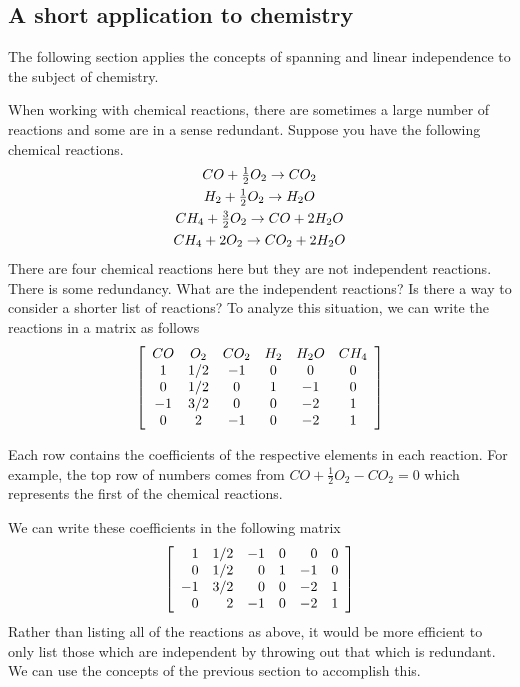\subsection{A short application to chemistry}

The following section applies the concepts of spanning and linear independence to the subject of chemistry. 

When working with chemical reactions, there are sometimes a large number of reactions and some are in a sense redundant. Suppose you have the following chemical
reactions.
\begin{equation*}
\begin{array}{c}
CO+\vspace{0.05in}\frac{1}{2}O_{2}\rightarrow CO_{2} \\
H_{2}+\vspace{0.05in}\frac{1}{2}O_{2}\rightarrow H_{2}O \\
CH_{4}+\vspace{0.05in}\frac{3}{2}O_{2}\rightarrow CO+2H_{2}O \\
CH_{4}+2O_{2}\rightarrow CO_{2}+2H_{2}O
\end{array}
\end{equation*}
There are four chemical reactions here but they are not independent
reactions. There is some redundancy. What are the independent reactions? Is
there a way to consider a shorter list of reactions? To analyze this
situation, we can write the reactions in a matrix as follows
\begin{equation*}
\left[
\begin{array}{cccccc}
CO & O_{2} & CO_{2} & H_{2} & H_{2}O & CH_{4} \\
1 & 1/2 & -1 & 0 & 0 & 0 \\
0 & 1/2 & 0 & 1 & -1 & 0 \\
-1 & 3/2 & 0 & 0 & -2 & 1 \\
0 & 2 & -1 & 0 & -2 & 1
\end{array}
\right]
\end{equation*}

Each row contains the coefficients of the respective elements in each reaction. For example, the top row of numbers comes from $CO+\frac{1}{2}O_{2}-CO_{2}=0$ which
represents the first of the chemical reactions. 

We can write these coefficients in the following matrix
\begin{equation*}
\left[
\begin{array}{rrrrrr}
1 & 1/2 & -1 & 0 & 0 & 0 \\
0 & 1/2 & 0 & 1 & -1 & 0 \\
-1 & 3/2 & 0 & 0 & -2 & 1 \\
0 & 2 & -1 & 0 & -2 & 1
\end{array}
\right]
\end{equation*}
Rather than listing all of the
reactions as above, it would be more efficient to only list those which are independent by throwing out that which is redundant. We can use the concepts of the previous section to accomplish this.

